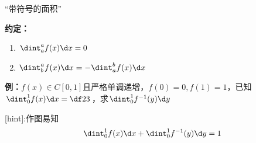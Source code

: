\begin{center}
	
	“带符号的面积” 
\end{center}

{\bf 约定：}
\begin{enumerate}[(1)]
  \setlength{\itemindent}{1cm}
  \item $\dint_a^af(x)\d x=0$
  \item $\dint_b^af(x)\d x=-\dint_a^bf(x)\d x$ 
\end{enumerate}

{\bf 例：}$f(x)\in C[0,1]$且严格单调递增，$f(0)=0,f(1)=1$，已知
$\dint_0^1f(x)\d x=\df23$，求$\dint_0^1f^{-1}(y)\d y$

{[hint]:}作图易知
$$\dint_0^1f(x)\d x+\dint_0^1f^{-1}(y)\d y=1$$

\begin{center}
\end{center}

